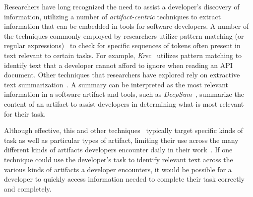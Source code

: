 Researchers have long recognized the need to assist a developer's discovery of information,
utilizing a number of
\textit{artifact-centric} techniques
to extract
information that can be embedded in
tools for software developers. 
A number of the techniques commonly employed by researchers utilize pattern matching (or regular expressions)~\cite{Maalej2013, Bavota2014, Chaparro2017}   
to check for specific sequences of tokens often present in text relevant to certain tasks. For example, \textit{Krec}~\cite{Robillard2015} utilizes pattern matching to identify text that a developer cannot afford to ignore when reading an API document.
Other techniques that researchers have explored rely on extractive text summarization~\cite{Rastkar2010, Lotufo2012, Murray2008}. 
A summary can be interpreted as the most relevant information in a software artifact 
and tools, such as \textit{DeepSum}~\cite{Li2018}, summarize the content of an artifact 
to assist developers in determining what is most relevant for their task.






Although effective, this and other techniques~\red{\cite{}} typically
target specific kinds of task as well as particular types of artifact, limiting their use across the
many different kinds of artifacts developers encounter
daily in their work~\red{\cite{}}.
If one technique could use the developer's task
to identify relevant text across the various kinds
of artifacts a developer encounters,
it would be possible for a
developer to quickly access information needed 
to complete their task correctly and completely.





